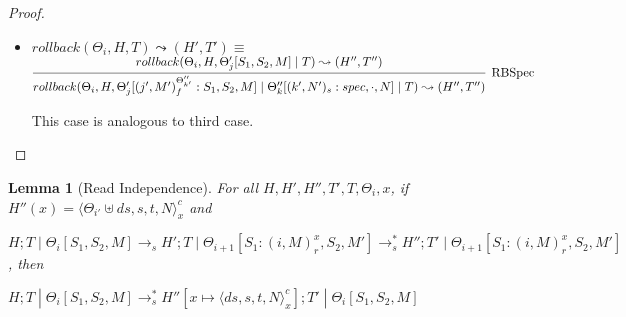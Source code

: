 \documentclass[9pt]{article}
\newtheorem{lemma}{Lemma}
\newcommand\specStep{\rightarrow_{s}}
\begin{document}
\begin{proof}
\begin{itemize}
This case is the same as the previous, except this it makes use of Lemma \ref{newIndependence} instead of Lemma \ref{writeIndependence}

\item $rollback(\Theta_i, H, T) \leadsto (H', T') \equiv$ \\
$ \infer[\text{RBSpec}]{rollback(\Theta_i, H, \Theta_j'[(j', M')_f^{\Theta_{k'}''} : S_1, S_2, M] \; | \; \Theta_k''[(k', N')_s : spec, \cdot, N] \; | \; T) \leadsto (H'', T'')}{rollback(\Theta_i, H, \Theta_j'[S_1, S_2, M] \; | \; T) \leadsto (H'', T'')}$

This case is analogous to third case.

\end{itemize}

\end{proof}

\begin{lemma}[Read Independence]
\label{readIndependence}
For all $H, H', H'', T', T, \Theta_i, x$, if $H''(x) = \langle \Theta_{i'} \uplus ds, s, t, N\rangle_x^c$ and 

$H; T \; | \; \Theta_i[S_1, S_2, M] \specStep H'; T \; | \; \Theta_{i+1}[S_1 : (i, M)_r^x, S_2, M'] \specStep^* H''; T' \; | \; \Theta_{i+1}[S_1 : (i, M)_r^x, S_2, M']$, then 

$H; T \; | \; \Theta_i[S_1, S_2, M] \specStep^* H''[x\mapsto \langle ds, s, t, N\rangle_x^c]; T' \; | \; \Theta_i[S_1, S_2, M]$
\end{lemma}
\end{document}
